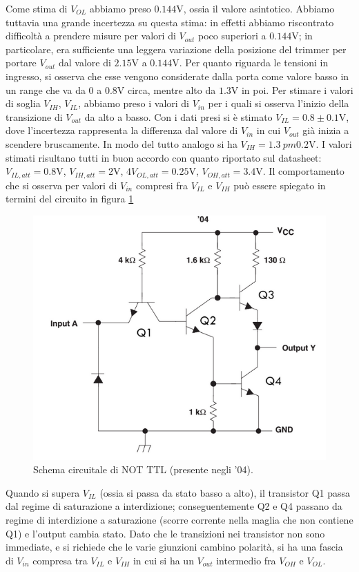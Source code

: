 \documentclass[10pt,a4paper]{article}
\begin{document}
Come stima di $V_{OL}$ abbiamo preso $0.144$V, ossia il valore asintotico. Abbiamo tuttavia una grande incertezza su questa stima: in effetti abbiamo riscontrato difficoltà a prendere misure per valori di $V_{out}$ poco superiori a $0.144$V; in particolare, era sufficiente una leggera variazione della posizione del trimmer per portare $V_{out}$ dal valore di $2.15$V a $0.144$V.
Per quanto riguarda le tensioni in ingresso, si osserva che esse vengono considerate dalla porta come valore basso in un range che va da $0$ a $0.8$V circa, mentre alto da $1.3$V in poi.
Per stimare i valori di soglia $V_{IH}$, $V_{IL}$, abbiamo preso i valori di $V_{in}$ per i quali si osserva l'inizio della transizione di $V_{out}$ da alto a basso. Con i dati presi si è stimato $V_{IL} = 0.8\pm 0.1$V, dove l'incertezza rappresenta la differenza dal valore di $V_{in}$ in cui $V_{out}$ già inizia a scendere bruscamente.
In modo del tutto analogo si ha $V_{IH} = 1.3\ pm 0.2$V. 
I valori stimati risultano tutti in buon accordo con quanto riportato sul datasheet:
$V_{IL,att}= 0.8$V, $V_{IH, att}=2$V, $4V_{OL, att}=0.25$V, $V_{OH, att}=3.4$V.
Il comportamento che si osserva per valori di $V_{in}$ compresi fra $V_{IL}$ e $V_{IH}$ può essere spiegato in termini del circuito in figura \ref{fig:ttl}
\begin{figure}
\centering
\includegraphics[scale=0.6]{ttl.png}
\caption{Schema circuitale di NOT TTL (presente negli '04).\label{fig:ttl}}
\end{figure}
Quando si supera $V_{IL}$ (ossia si passa da stato basso a alto), il transistor Q1 passa dal regime di saturazione a interdizione; conseguentemente Q2 e Q4 passano da regime di interdizione a saturazione (scorre corrente nella maglia che non contiene Q1) e l'output cambia stato. Dato che le transizioni nei transistor non sono immediate, e si richiede che le varie giunzioni cambino polarità, si ha una fascia di $V_{in}$ compresa tra $V_{IL}$ e $V_{IH}$ in cui si ha un $V_{out}$ intermedio fra $V_{OH}$ e $V_{OL}$.
 
\end{document}
